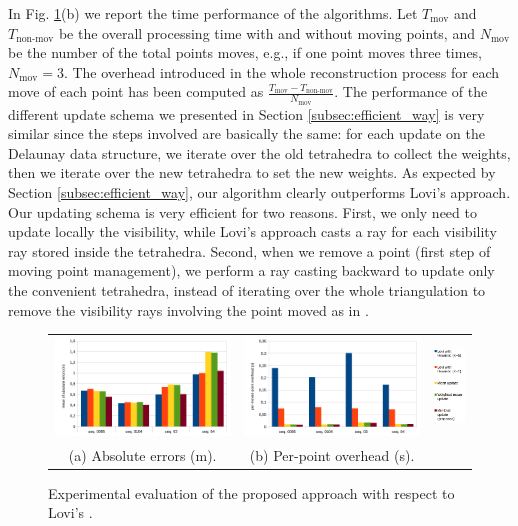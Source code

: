 In Fig. \ref{tab:results}(b) we report the time performance of the algorithms.
Let $T_{\text{mov}}$ and $T_{\text{non-mov}}$ be the overall processing time with and without moving points, and $N_{\text{mov}}$ be the number of the total points moves, e.g., if one point moves three times, $N_{\text{mov}}=3$.
The overhead introduced in the whole reconstruction process for each move of each point has been computed as $\frac{T_{\text{mov}} - T_{\text{non-mov}}}{N_{\text{mov}}}$.
The performance of the different update schema we presented in Section \ref{subsec:efficient_way} is very similar since the steps involved are basically the same: for each update on the Delaunay data structure, we iterate over the old tetrahedra to collect the weights, then we iterate over the new tetrahedra to set the new weights.
As expected by Section \ref{subsec:efficient_way}, our algorithm clearly outperforms Lovi's approach. Our updating schema is very efficient for two reasons. 
First, we only need to update locally the visibility, while Lovi's approach casts a ray for each visibility ray stored inside the tetrahedra.
Second, when we remove a point (first step of moving point management), we perform a ray casting backward to update only the convenient tetrahedra,  instead of iterating over the whole triangulation to remove the visibility rays involving the point moved as in \cite{Lovi_et_al_11}.
  
 
\begin{figure}[t]
\centering
  \begin{tabular}{ccc}
    \centering
    \includegraphics[height=0.25\textwidth]{././img//results.pdf}&
    \includegraphics[height=0.25\textwidth]{././img//resultsTiming.pdf}&
    \includegraphics[height=0.22\textwidth]{././img//legenda}\\
    (a) Absolute errors (m).&
    (b) Per-point overhead (s).&\\
  \end{tabular}
  \caption{Experimental evaluation of the proposed approach with respect to Lovi's \cite{Lovi_et_al_11}.}
   \label{tab:results}
\end{figure}



